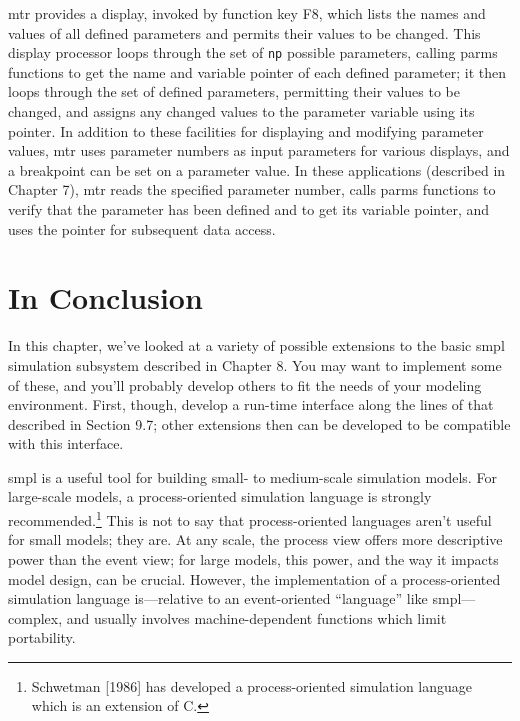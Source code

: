 mtr provides a display, invoked by function key F8, which lists the
names and values of all defined parameters and permits their values to be
changed. This display processor loops through the set of \texttt{np} possible
parameters, calling parms functions to get the name and variable pointer of
each defined parameter; it then loops through the set of defined parameters,
permitting their values to be changed, and assigns any changed
values to the parameter variable using its pointer. In addition to these
facilities for displaying and modifying parameter values, mtr uses
parameter numbers as input parameters for various displays, and a breakpoint
can be set on a parameter value. In these applications (described in
Chapter 7), mtr reads the specified parameter number, calls parms functions
to verify that the parameter has been defined and to get its variable
pointer, and uses the pointer for subsequent data access.

\section{In Conclusion}

In this chapter, we've looked at a variety of possible extensions to the
basic smpl simulation subsystem described in Chapter 8. You may want to
implement some of these, and you'll probably develop others to fit the needs
of your modeling environment. First, though, develop a run-time interface
along the lines of that described in Section 9.7; other extensions then can be
developed to be compatible with this interface.

smpl is a useful tool for building small- to medium-scale simulation
models. For large-scale models, a process-oriented simulation language is
strongly recommended.\footnote{Schwetman [1986] has developed a process-oriented simulation language which is an extension of C.}
This is not to say that process-oriented languages
aren't useful for small models; they are. At any scale, the process view
offers more descriptive power than the event view; for large models, this
power, and the way it impacts model design, can be crucial. However, the
implementation of a process-oriented simulation language is---relative to an
event-oriented ``language'' like smpl---complex, and usually involves
machine-dependent functions which limit portability.

